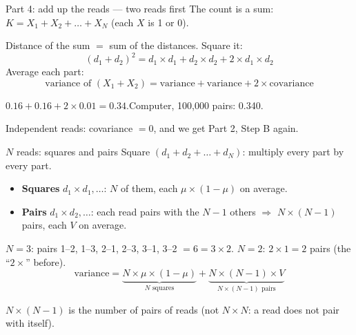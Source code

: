 \documentclass[aspectratio=169,11pt]{beamer}
\begin{document}
\begin{frame}{Part 4: add up the reads --- two reads first}
The count is a sum: $K = X_1 + X_2 + \dots + X_N$ (each $X$ is 1 or 0).
\medskip

Distance of the sum $=$ sum of the distances. Square it:
\[
(d_1 + d_2)^2 = d_1 \times d_1 + d_2 \times d_2 + 2 \times d_1 \times d_2
\]
Average each part:
\[
\text{variance of } (X_1 + X_2) = \text{variance} + \text{variance} + 2 \times \text{covariance}
\]
\begin{worked}[ 4e: case B]
$0.16 + 0.16 + 2 \times 0.01 = 0.34$.\quad Computer, 100{,}000 pairs: 0.340.
\end{worked}
{\small Independent reads: covariance $= 0$, and we get Part 2, Step B again.}
\end{frame}

\begin{frame}{$N$ reads: squares and pairs}
\vspace{-0.3em}
Square $(d_1 + d_2 + \dots + d_N)$: multiply every part by every part.
\begin{itemize}
\item \textbf{Squares} $d_1 \times d_1, \dots$: $N$ of them, each
  $\mu \times (1-\mu)$ on average.
\item \textbf{Pairs} $d_1 \times d_2, \dots$: each read pairs with the
  $N-1$ others $\Rightarrow$ \alert{$N \times (N-1)$ pairs}, each $V$ on
  average.
\end{itemize}
{\small $N = 3$: pairs 1--2, 1--3, 2--1, 2--3, 3--1, 3--2 $= 6 = 3 \times 2$.
\quad $N = 2$: $2 \times 1 = 2$ pairs (the ``$2\times$'' before).}
\[
\text{variance} = \underbrace{N \times \mu \times (1-\mu)}_{N \text{ squares}}
 + \underbrace{N \times (N-1) \times V}_{N \times (N-1) \text{ pairs}}
\]
\begin{remember}
$N \times (N-1)$ is the \alert{number of pairs of reads} (not $N \times N$:
a read does not pair with itself).
\end{remember}
\end{frame}
\end{document}

